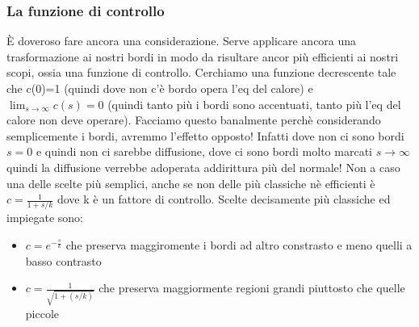 \subsubsection{La funzione di controllo}
\`E doveroso fare ancora una considerazione. Serve applicare ancora una trasformazione ai nostri bordi in modo da risultare ancor più efficienti ai nostri scopi, ossia una funzione di controllo. Cerchiamo una funzione decrescente tale che c(0)=1 (quindi dove non c'è bordo opera l'eq del calore) e $\lim_{s\to\infty}c(s)=0$ (quindi tanto più i bordi sono accentuati, tanto più l'eq del calore non deve operare).
Facciamo questo banalmente perchè considerando semplicemente i bordi, avremmo l'effetto opposto! Infatti dove non ci sono bordi $s=0$ e quindi non ci sarebbe diffusione, dove ci sono bordi molto marcati $s\to\infty$ quindi la diffusione verrebbe adoperata addirittura più del normale!
Non a caso una delle scelte più semplici, anche se non delle più classiche nè efficienti è $c=\frac{1}{1+s/k}$ dove k è un fattore di controllo.
Scelte decisamente più classiche ed impiegate sono:
\begin{itemize}
    \item $c=e^{-\frac{s}{k}}$ che preserva maggiromente i bordi ad altro constrasto e meno quelli a basso contrasto
    \item $c=\frac{1}{\sqrt{1+(s/k)}}$ che preserva maggiormente regioni grandi piuttosto che quelle piccole
\end{itemize} 

\newpage
